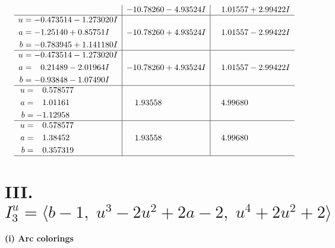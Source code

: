 \documentclass[1p]{elsarticle_modified}
\theoremstyle{definition}
\begin{document}
$$\begin{array}{c|c|c}
 & -10.78260 - 4.93524 I & \phantom{-}1.01557 + 2.99422 I \\ \hline\begin{aligned}
u &= -0.473514 - 1.273020 I \\
a &= -1.25140 + 0.85751 I \\
b &= -0.783945 + 1.141180 I\end{aligned}
 & -10.78260 + 4.93524 I & \phantom{-}1.01557 - 2.99422 I \\ \hline\begin{aligned}
u &= -0.473514 - 1.273020 I \\
a &= \phantom{-}0.21489 - 2.01964 I \\
b &= -0.93848 - 1.07490 I\end{aligned}
 & -10.78260 + 4.93524 I & \phantom{-}1.01557 - 2.99422 I \\ \hline\begin{aligned}
u &= \phantom{-}0.578577\phantom{ +0.000000I} \\
a &= \phantom{-}1.01161\phantom{ +0.000000I} \\
b &= -1.12958\phantom{ +0.000000I}\end{aligned}
 & \phantom{-}1.93558\phantom{ +0.000000I} & \phantom{-}4.99680\phantom{ +0.000000I} \\ \hline\begin{aligned}
u &= \phantom{-}0.578577\phantom{ +0.000000I} \\
a &= \phantom{-}1.38452\phantom{ +0.000000I} \\
b &= \phantom{-}0.357319\phantom{ +0.000000I}\end{aligned}
 & \phantom{-}1.93558\phantom{ +0.000000I} & \phantom{-}4.99680\phantom{ +0.000000I}\\
 \hline 
 \end{array}$$\newpage\newpage\renewcommand{\arraystretch}{1}
\centering \section*{III. $I^u_{3}= \langle b-1,\;u^3-2 u^2+2 a-2,\;u^4+2 u^2+2 \rangle$}
\flushleft \textbf{(i) Arc colorings}\\
\end{document}
